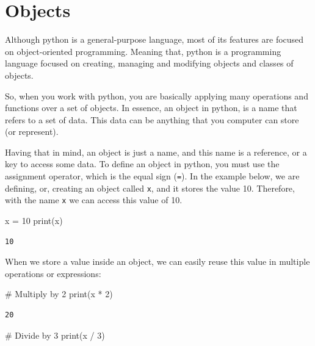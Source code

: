 \documentclass[
  11pt,
  letterpaper,
  DIV=11,
  numbers=noendperiod]{scrreprt}
\newenvironment{Shaded}{\begin{snugshade}}{\end{snugshade}}
\newcommand{\BuiltInTok}[1]{\textcolor[rgb]{0.00,0.23,0.31}{#1}}
\newcommand{\CommentTok}[1]{\textcolor[rgb]{0.37,0.37,0.37}{#1}}
\newcommand{\DecValTok}[1]{\textcolor[rgb]{0.68,0.00,0.00}{#1}}
\newcommand{\NormalTok}[1]{\textcolor[rgb]{0.00,0.23,0.31}{#1}}
\newcommand{\OperatorTok}[1]{\textcolor[rgb]{0.37,0.37,0.37}{#1}}
\begin{document}
\hypertarget{objects}{%
\section{Objects}\label{objects}}

Although python is a general-purpose language, most of its features are
focused on object-oriented programming. Meaning that, python is a
programming language focused on creating, managing and modifying objects
and classes of objects.

So, when you work with python, you are basically applying many
operations and functions over a set of objects. In essence, an object in
python, is a name that refers to a set of data. This data can be
anything that you computer can store (or represent).

Having that in mind, an object is just a name, and this name is a
reference, or a key to access some data. To define an object in python,
you must use the assignment operator, which is the equal sign
(\texttt{=}). In the example below, we are defining, or, creating an
object called \texttt{x}, and it stores the value 10. Therefore, with
the name \texttt{x} we can access this value of 10.

\begin{Shaded}
\begin{Highlighting}[]
\NormalTok{x }\OperatorTok{=} \DecValTok{10}
\BuiltInTok{print}\NormalTok{(x)}
\end{Highlighting}
\end{Shaded}

\begin{verbatim}
10
\end{verbatim}

When we store a value inside an object, we can easily reuse this value
in multiple operations or expressions:

\begin{Shaded}
\begin{Highlighting}[]
\CommentTok{\# Multiply by 2}
\BuiltInTok{print}\NormalTok{(x }\OperatorTok{*} \DecValTok{2}\NormalTok{)}
\end{Highlighting}
\end{Shaded}

\begin{verbatim}
20
\end{verbatim}

\begin{Shaded}
\begin{Highlighting}[]
\CommentTok{\# Divide by 3}
\BuiltInTok{print}\NormalTok{(x }\OperatorTok{/} \DecValTok{3}\NormalTok{)}
\end{Highlighting}
\end{Shaded}
\end{document}
